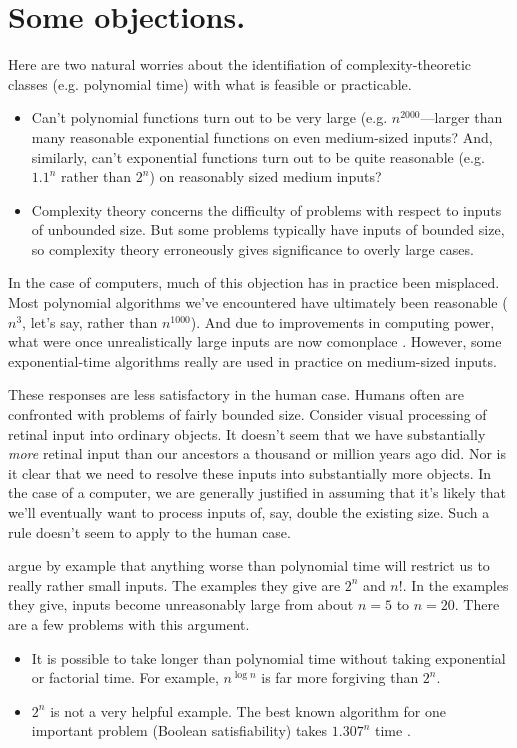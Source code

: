 \section*{Some objections.}
Here are two natural worries about the identifiation of complexity-theoretic classes (e.g. polynomial time) with what is feasible or practicable.
\begin{itemize}
\item Can't polynomial functions turn out to be very large (e.g. \(n^{2000}\)—larger than many reasonable exponential functions on even medium-sized inputs? And, similarly, can’t exponential functions turn out to be quite reasonable (e.g. \(1.1^n\) rather than \(2^n\)) on reasonably sized medium inputs?
\item Complexity theory concerns the difficulty of problems with respect to inputs of unbounded size. But some problems typically have inputs of bounded size, so complexity theory erroneously gives significance to overly large cases.
\end{itemize}

In the case of computers, much of this objection has in practice been misplaced. Most polynomial algorithms we’ve encountered have ultimately been reasonable (\(n^3\), let’s say, rather than \(n^{1000}\)). And due to improvements in computing power, what were once unrealistically large inputs are now comonplace \parencite{moore1965}. However, some exponential-time algorithms really are used in practice on medium-sized inputs.

These responses are less satisfactory in the human case. Humans often are confronted with problems of fairly bounded size. Consider visual processing of retinal input into ordinary objects. It doesn’t seem that we have substantially \emph{more} retinal input than our ancestors a thousand or million years ago did. Nor is it clear that we need to resolve these inputs into substantially more objects. In the case of a computer, we are generally justified in assuming that it’s likely that we’ll eventually want to process inputs of, say, double the existing size. Such a rule doesn’t seem to apply to the human case.

\textcite[5~ff]{vanrooij2019} argue by example that anything worse than polynomial time will restrict us to really rather small inputs. The examples they give are \(2^n\) and \(n!\). In the examples they give, inputs become unreasonably large from about \(n=5\) to \(n=20\). There are a few problems with this argument.
\begin{itemize}
    \item It is possible to take longer than polynomial time without taking exponential or factorial time. For example, \(n^{\log n}\) is far more forgiving than \(2^n\).
    \item \(2^n\) is not a very helpful example. The best known algorithm for one important problem (Boolean satisfiability) takes \(1.307^n\) time \parencite{hansen2019}. 
\end{itemize}

